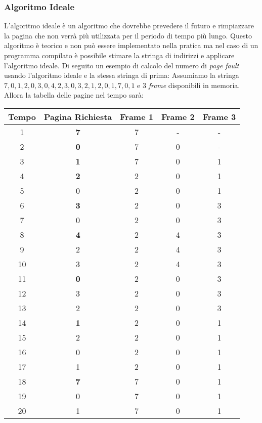         \subsubsection{Algoritmo Ideale}
            L'algoritmo ideale è un algoritmo che dovrebbe prevedere il futuro e rimpiazzare la pagina che non verrà più utilizzata per il periodo di tempo più lungo. Questo algoritmo è teorico e non può essere implementato nella pratica ma nel caso di un programma compilato è possibile stimare la stringa di indirizzi e applicare l'algoritmo ideale. Di seguito un esempio di calcolo del numero di \textit{page fault} usando l'algoritmo ideale e la stessa stringa di prima:\newline
            Assumiamo la stringa $7,0,1,2,0,3,0,4,2,3,0,3,2,1,2,0,1,7,0,1$ e 3 \textit{frame} disponibili in memoria. Allora la tabella delle pagine nel tempo sarà:
            \begin{table}[H]
                \centering
                \begin{tabular}{|c|c|c|c|c|}
                    \hline
                    \textbf{Tempo} & \textbf{Pagina Richiesta} & \textbf{Frame 1} & \textbf{Frame 2} & \textbf{Frame 3} \\
                    \hline
                    1 & \textbf{7} & 7 & - & - \\
                    2 & \textbf{0} & 7 & 0 & - \\
                    3 & \textbf{1} & 7 & 0 & 1 \\
                    4 & \textbf{2} & 2 & 0 & 1 \\
                    5 & 0 & 2 & 0 & 1 \\
                    6 & \textbf{3} & 2 & 0 & 3 \\
                    7 & 0 & 2 & 0 & 3 \\
                    8 & \textbf{4} & 2 & 4 & 3 \\
                    9 & 2 & 2 & 4 & 3 \\
                    10 & 3 & 2 & 4 & 3 \\
                    11 & \textbf{0} & 2 & 0 & 3 \\
                    12 & 3 & 2 & 0 & 3 \\
                    13 & 2 & 2 & 0 & 3 \\
                    14 & \textbf{1} & 2 & 0 & 1 \\
                    15 & 2 & 2 & 0 & 1 \\
                    16 & 0 & 2 & 0 & 1 \\
                    17 & 1 & 2 & 0 & 1 \\
                    18 & \textbf{7} & 7 & 0 & 1 \\
                    19 & 0 & 7 & 0 & 1 \\
                    20 & 1 & 7 & 0 & 1 \\
                    \hline
                \end{tabular}
            \end{table}
